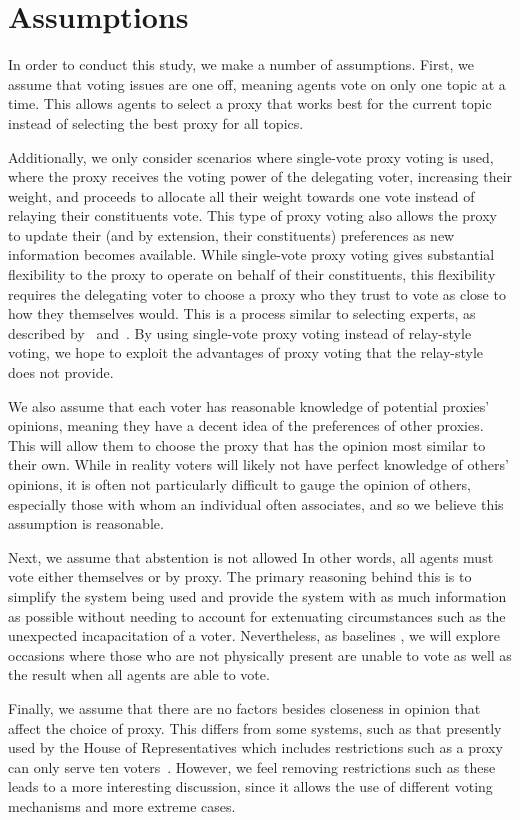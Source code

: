 \section{Assumptions}\label{sec:assumptions}
In order to conduct this study, we make a number of assumptions.
First, we assume that voting issues are one off, meaning agents vote on only one
topic at a time.
This allows agents to select a proxy that works best for the current topic instead of
selecting the best proxy for all topics.

Additionally, we only consider scenarios where single-vote proxy voting is used, where
the proxy receives the voting power of the delegating voter, increasing their weight,
and proceeds to allocate all their weight towards one vote instead of relaying their
constituents vote.
This type of proxy voting also allows the proxy to update their (and by extension, their
constituents) preferences as new information becomes available.
While single-vote proxy voting gives substantial flexibility to the proxy to operate
on behalf of their constituents, this flexibility requires the delegating voter to
choose a proxy who they trust to vote as close to how they themselves would.
This is a process similar to selecting experts, as described by~\cite{Miller1969}
and~\cite{Mueller1972}.
By using single-vote proxy voting instead of relay-style voting, we hope to exploit
the advantages of proxy voting that the relay-style does not provide.

We also assume that each voter has reasonable knowledge of potential proxies'
opinions, meaning they have a decent idea of the preferences of other proxies.
This will allow them to choose the proxy that has the opinion most similar to their own.
While in reality voters will likely not have perfect knowledge of others' opinions,
it is often not particularly difficult to gauge the opinion of others, especially
those with whom an individual often associates, and so we believe this assumption is
reasonable.

Next, we assume that abstention is not allowed
In other words, all agents must vote either themselves or by proxy.
The primary reasoning behind this is to simplify the system being used and provide
the system with as much information as possible without needing to account for
extenuating circumstances such as the unexpected incapacitation of a voter.
Nevertheless, as baselines , we will explore occasions where those who are not
physically present are unable to vote as well as the result when all agents are able
to vote.

Finally, we assume that there are no factors besides closeness in opinion that affect
the choice of proxy.
This differs from some systems, such as that presently used by the House of
Representatives which includes restrictions such as a proxy can only serve ten
voters~\cite{CERP2020}.
However, we feel removing restrictions such as these leads to a more interesting
discussion, since it allows the use of different voting mechanisms and more extreme
cases.

